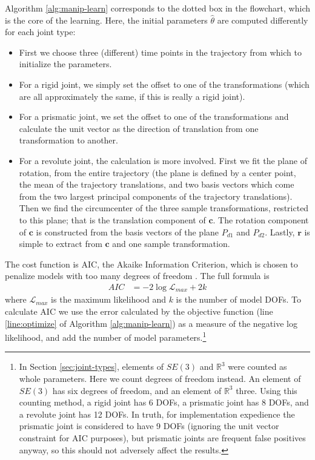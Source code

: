 \documentclass[letterpaper, 10 pt, conference]{ieeeconf}  %
\def\xse{\bm}            \def\xsestr{in boldface}
\begin{document}
Algorithm \ref{alg:manip-learn} corresponds to the dotted box in the flowchart, which is the core of the learning. Here, the initial parameters $\hat{\theta}$ are computed differently for each joint type:
\begin{itemize}
  \item First we choose three (different) time points in the trajectory from which to initialize the parameters.
  \item For a rigid joint, we simply set the offset to one of the transformations (which are all approximately the same, if this is really a rigid joint).
  \item For a prismatic joint, we set the offset to one of the transformations and calculate the unit vector as the direction of translation from one transformation to another.
  \item For a revolute joint, the calculation is more involved. First we fit the plane of rotation, from the entire trajectory (the plane is defined by a center point, the mean of the trajectory translations, and two basis vectors which come from the two largest principal components of the trajectory translations). Then we find the circumcenter of the three sample transformations, restricted to this plane; that is the translation component of $\xse{c}$. The rotation component of $\xse{c}$ is constructed from the basis vectors of the plane $P_{d1}$ and $P_{d2}$. Lastly, $\xse{r}$ is simple to extract from $\xse{c}$ and one sample transformation.
\end{itemize}

The cost function is AIC, the Akaike Information Criterion, which is chosen to penalize models with too many degrees of freedom \cite{Liddle2008}. The full formula is
\begin{align}
  AIC &= -2 \log \mathcal{L}_{max} + 2k
\end{align}
where $\mathcal{L}_{max}$ is the maximum likelihood and $k$ is the number of model DOFs. To calculate AIC we use the error calculated by the objective function (line \ref{line:optimize} of Algorithm \ref{alg:manip-learn}) as a measure of the negative log likelihood, and add the number of model parameters.\footnote{In Section \ref{sec:joint-types}, elements of $SE(3)$ and $\mathbb{R}^3$ were counted as whole parameters. Here we count degrees of freedom instead. An element of $SE(3)$ has six degrees of freedom, and an element of $\mathbb{R}^3$ three. Using this counting method, a rigid joint has 6 DOFs, a prismatic joint has 8 DOFs, and a revolute joint has 12 DOFs. In truth, for implementation expedience the prismatic joint is considered to have 9 DOFs (ignoring the unit vector constraint for AIC purposes), but prismatic joints are frequent false positives anyway, so this should not adversely affect the results.}
\end{document}
